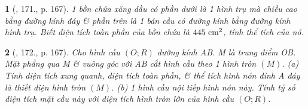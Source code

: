 \documentclass{article}
\newtheorem{baitoan}{}
\begin{document}
\begin{baitoan}[\cite{Tuyen_Toan_9_old}, 171., p. 167]
	1 bồn chứa xăng dầu có phần dưới là 1 hình trụ mà chiều cao bằng đường kính đáy \& phần trên là 1 bán cầu có đường kính bằng đường kính hình trụ. Biết diện tích toàn phần của bồn chứa là $445\ {\rm cm}^2$, tính thể tích của nó.
\end{baitoan}

\begin{baitoan}[\cite{Tuyen_Toan_9_old}, 172., p. 167]
	Cho hình cầu $(O;R)$ đường kính AB. M là trung điểm OB. Mặt phẳng qua M \& vuông góc với AB cắt hình cầu theo 1 hình tròn $(M)$. (a) Tính diện tích xung quanh, diện tích toàn phần, \& thể tích hình nón đỉnh A đáy là thiết diện hình tròn $(M)$. (b) 1 hình cầu nội tiếp hình nón này. Tính tỷ số diện tích mặt cầu này với diện tích hình tròn lớn của hình cầu $(O;R)$.
\end{baitoan}


\printbibliography[heading=bibintoc]
	
\end{document}
